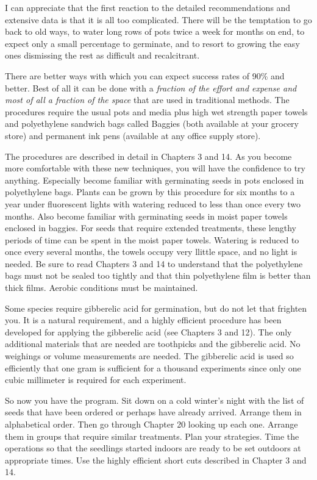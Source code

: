 I can appreciate that the first reaction to the detailed recommendations and
extensive data is that it is all too complicated. There will be the temptation to go back
to old ways, to water long rows of pots twice a week for months on end, to expect only
a small percentage to germinate, and to resort to growing the easy ones dismissing
the rest as difficult and recalcitrant.

There are better ways with which you can expect success rates of 90\% and
better. Best of all it can be done with a \textit{fraction of the effort and expense
and most of all a fraction of the space} that are used in traditional methods.
The procedures require the usual pots and media plus high wet strength paper
towels and polyethylene sandwich bags called Baggies (both available at your
grocery store) and permanent ink pens (available at any office supply store).

The procedures are described in detail in Chapters 3 and 14. As you become more
comfortable with these new techniques, you will have the confidence to try
anything. Especially become familiar with germinating seeds in pots enclosed in
polyethylene bags. Plants can be grown by this procedure for six months to a
year under fluorescent lights with watering reduced to less than once every two
months. Also become familiar with germinating seeds in moist paper towels
enclosed in baggies. For seeds that require extended treatments, these lengthy
periods of time can be spent in the moist paper towels. Watering is reduced to
once every several months, the towels occupy very llittle space, and no light
is needed. Be sure to read Chapters 3 and 14 to understand that the
polyethylene bags must not be sealed too tightly and that thin polyethylene
film is better than thick films. Aerobic conditions must be maintained.

Some species require gibberelic acid for germination, but do not let that frighten
you. It is a natural requirement, and a highly efficient procedure has been developed
for applying the gibberelic acid (see Chapters 3 and 12). The only additional materials
that are needed are toothpicks and the gibberelic acid. No weighings or volume
measurements are needed. The gibberelic acid is used so efficiently that one gram is
sufficient for a thousand experiments since only one cubic millimeter is required for
each experiment.

So now you have the program. Sit down on a cold winter's night with the list of
seeds that have been ordered or perhaps have already arrived. Arrange them in
alphabetical order. Then go through Chapter 20 looking up each one. Arrange them
in groups that require similar treatments. Plan your strategies. Time the operations so
that the seedlings started indoors are ready to be set outdoors at appropriate times.
Use the highly efficient short cuts described in Chapter 3 and 14.


